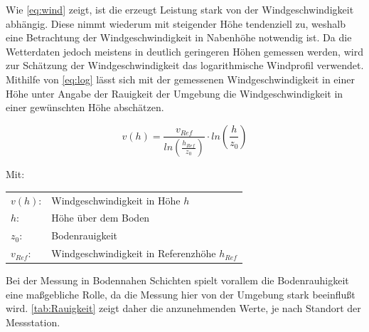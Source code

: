 Wie \autoref{eq:wind} zeigt, ist die erzeugt Leistung stark von der Windgeschwindigkeit abhängig. Diese nimmt wiederum mit steigender Höhe tendenziell zu, weshalb eine Betrachtung der Windgeschwindigkeit in Nabenhöhe notwendig ist. Da die Wetterdaten jedoch meistens in deutlich geringeren Höhen gemessen werden, wird zur Schätzung der Windgeschwindigkeit das logarithmische Windprofil verwendet. Mithilfe von \autoref{eq:log} lässt sich mit der gemessenen Windgeschwindigkeit in einer Höhe unter Angabe der Rauigkeit der Umgebung die Windgeschwindigkeit in einer gewünschten Höhe abschätzen. \cite{Hoehenprofil}

\begin{equation}
	v(h) = \frac{v_{Ref}}{ln\left(\frac{h_{Ref}}{z_0}\right)} \cdot ln\left(\frac{h}{z_0}\right)
	\label{eq:log}
\end{equation}

Mit:

\begin{flushleft}
	\begin{tabular}[htpb]{ll}
		$v(h)$: & Windgeschwindigkeit in Höhe $h$ \\
		$h$: & Höhe über dem Boden \\
		$z_0$: & Bodenrauigkeit \\
		$v_{Ref}$: & Windgeschwindigkeit in Referenzhöhe $h_{Ref}$ 
	\end{tabular}
\end{flushleft}

Bei der Messung in Bodennahen Schichten spielt vorallem die Bodenrauhigkeit eine maßgebliche Rolle, da die Messung hier von der Umgebung stark beeinflußt wird. \autoref{tab:Rauigkeit} zeigt daher die anzunehmenden Werte, je nach Standort der Messstation.  

